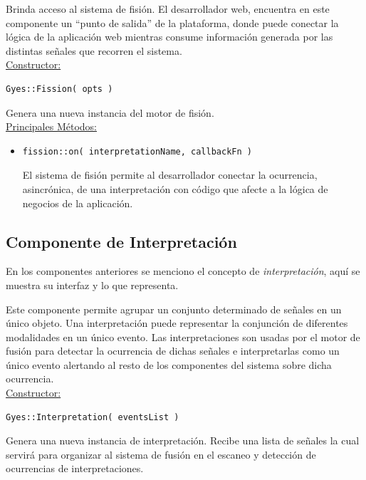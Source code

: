 Brinda acceso al sistema de fisión. El desarrollador web, encuentra en este componente un ``punto de salida'' de la plataforma, donde puede conectar la lógica de la aplicación web mientras consume información generada por las distintas señales que recorren el sistema.
\\

\underline{\textsf{Constructor:}}\\
\begin{lstlisting}
Gyes::Fission( opts )
\end{lstlisting}
Genera una nueva instancia del motor de fisión.
\\

\underline{\textsf{Principales Métodos:}}\\
\begin{itemize}
\item[]
\begin{lstlisting}
fission::on( interpretationName, callbackFn )
\end{lstlisting}
El sistema de fisión permite al desarrollador conectar la ocurrencia, asincrónica, de una interpretación con código que afecte a la lógica de negocios de la aplicación.
\end{itemize}

\subsection{Componente de Interpretación}

En los componentes anteriores se menciono el concepto de \emph{interpretación}, aquí se muestra su interfaz y lo que representa.

Este componente permite agrupar un conjunto determinado de señales en un único objeto.
Una interpretación puede representar la conjunción de diferentes modalidades en un único evento.
Las interpretaciones son usadas por el motor de fusión para detectar la ocurrencia de dichas señales e interpretarlas como un único evento alertando al resto de los componentes del sistema sobre dicha ocurrencia.
\\

\underline{\textsf{Constructor:}}
\begin{lstlisting}
Gyes::Interpretation( eventsList )
\end{lstlisting}
Genera una nueva instancia de interpretación. Recibe una lista de señales la cual servirá para organizar al sistema de fusión en el escaneo y detección de ocurrencias de interpretaciones.
\\

